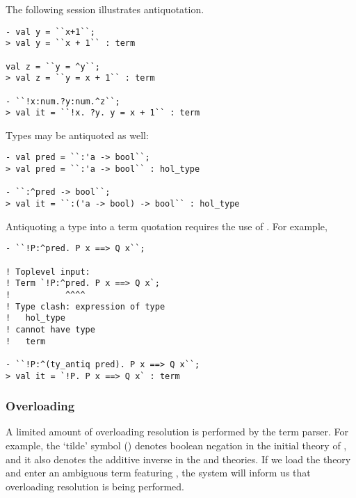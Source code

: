{The following session illustrates antiquotation.

\setcounter{sessioncount}{1}
\begin{session}
\begin{hol}
\begin{verbatim}
- val y = ``x+1``;
> val y = ``x + 1`` : term

val z = ``y = ^y``;
> val z = ``y = x + 1`` : term

- ``!x:num.?y:num.^z``;
> val it = ``!x. ?y. y = x + 1`` : term
\end{verbatim}
\end{hol}
\end{session}

\noindent Types may be antiquoted as well:

\setcounter{sessioncount}{1}
\begin{session}
\begin{hol}
\begin{verbatim}
- val pred = ``:'a -> bool``;
> val pred = ``:'a -> bool`` : hol_type

- ``:^pred -> bool``;
> val it = ``:('a -> bool) -> bool`` : hol_type
\end{verbatim}
\end{hol}
\end{session}

\noindent Antiquoting a type into a term quotation requires the use of
. For example,%
%

\begin{session}
\begin{hol}
\begin{verbatim}
- ``!P:^pred. P x ==> Q x``;

! Toplevel input:
! Term `!P:^pred. P x ==> Q x`;
!           ^^^^
! Type clash: expression of type
!   hol_type
! cannot have type
!   term

- ``!P:^(ty_antiq pred). P x ==> Q x``;
> val it = `!P. P x ==> Q x` : term
\end{verbatim}
\end{hol}
\end{session}

\subsubsection{Overloading}

A limited amount of overloading resolution is performed by the term
parser. For example, the `tilde' symbol (\holtxt{\~{}})
denotes boolean negation in the initial theory of \HOL, and it also denotes
the additive inverse in the  and
 theories. If we load the 
theory and enter an ambiguous term featuring \holtxt{\~{}}, the
system will inform us that overloading resolution is being performed.

}
